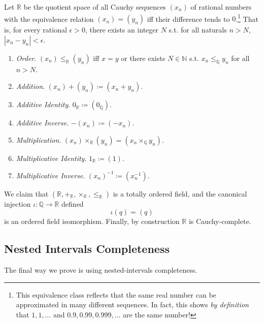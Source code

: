   \begin{theorem}
    Let $\mathbb{R}$ be the quotient space of all Cauchy sequences $(x_n)$ of rational numbers with the equivalence relation $(x_n) = (y_n)$ iff their difference tends to $0$.\footnote{This equivalence class reflects that the same real number can be approximated in many different sequences. In fact, this shows \textit{by definition} that $1, 1, \ldots$ and $0.9, 0.99, 0.999, \ldots$ are the same number!} That is, for every rational $\epsilon > 0$, there exists an integer $N$ s.t. for all naturals $n > N$, $|x_n - y_n| < \epsilon$. 
    \begin{enumerate}
      \item \textit{Order}. $(x_n) \leq_{\mathbb{R}} (y_n)$ iff $x = y$ or there exists $N \in \mathbb{N}$ s.t. $x_n \leq_{\mathbb{Q}} y_n$ for all $n > N$. 
      \item \textit{Addition}. $(x_n) + (y_n) \coloneqq (x_n + y_n)$. 
      \item \textit{Additive Identity}. $0_{\mathbb{R}} \coloneqq (0_{\mathbb{Q}})$. 
      \item \textit{Additive Inverse}. $-(x_n) \coloneqq (-x_n)$. 
      \item \textit{Multiplication}. $(x_n) \times_{\mathbb{R}} (y_n) = (x_n \times_{\mathbb{Q}} y_n)$. 
      \item \textit{Multiplicative Identity}. $1_{\mathbb{R}} \coloneqq (1)$. 
      \item \textit{Multiplicative Inverse}. $(x_n)^{-1} \coloneqq (x_n^{-1})$. 
    \end{enumerate}
    We claim that $(\mathbb{R}, +_{\mathbb{R}}, \times_{\mathbb{R}}, \leq_{\mathbb{R}})$ is a totally ordered field, and the canonical injection $\iota: \mathbb{Q} \rightarrow \mathbb{R}$ defined 
    \begin{equation}
      \iota(q) = (q)
    \end{equation} 
    is an ordered field isomorphism. Finally, by construction $\mathbb{R}$ is Cauchy-complete. 
  \end{theorem}

\subsection{Nested Intervals Completeness} 

  The final way we prove is using nested-intervals completeness.  

